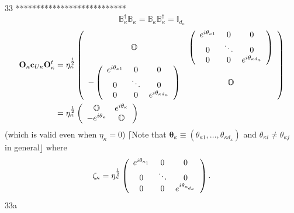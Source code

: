 \documentclass[aps,preprint]{revtex4}%
\begin{document}
33 ***************************
\[
\mathbb{B}_{\kappa}^{\dagger}\mathbb{B}_{\kappa}=\mathbb{B}_{\kappa}%
\mathbb{B}_{\kappa}^{\dagger}=\mathbb{I}_{d_{\kappa}}%
\]%
\begin{align*}
\mathbf{O}_{\kappa}\mathbf{c}_{U\kappa}\mathbf{O}_{\kappa}^{t}  &
=\eta_{\kappa}^{\frac{1}{2}}\left(
\begin{array}
[c]{cc}%
\mathbb{O} & \left(
\begin{array}
[c]{ccc}%
e^{i\mathbf{\theta}_{\kappa1}} & 0 & 0\\
0 & \ddots & 0\\
0 & 0 & e^{i\mathbf{\theta}_{\kappa d_{\kappa}}}%
\end{array}
\right) \\
-\left(
\begin{array}
[c]{ccc}%
e^{i\mathbf{\theta}_{\kappa1}} & 0 & 0\\
0 & \ddots & 0\\
0 & 0 & e^{i\mathbf{\theta}_{\kappa d_{\kappa}}}%
\end{array}
\right)  & \mathbb{O}%
\end{array}
\right) \\
&  =\eta_{\kappa}^{\frac{1}{2}}\left(
\begin{array}
[c]{cc}%
\mathbb{O} & e^{i\mathbf{\theta}_{\kappa}}\\
-e^{i\mathbf{\theta}_{\kappa}} & \mathbb{O}%
\end{array}
\right)
\end{align*}
(which is valid even when $\eta_{\kappa}=0$) $\lceil$Note that $\mathbf{\theta
}_{\kappa}\equiv\left(  \theta_{\kappa1},\ldots,\theta_{\kappa d_{\kappa}%
}\right)  $ and $\theta_{\kappa i}\neq\theta_{\kappa j}$ in general$\rfloor$
where
\[
\mathbf{\zeta}_{\kappa}=\eta_{\kappa}^{\frac{1}{2}}\left(
\begin{array}
[c]{ccc}%
e^{i\mathbf{\theta}_{\kappa_{1}}} & 0 & 0\\
0 & \ddots & 0\\
0 & 0 & e^{i\mathbf{\theta}_{\kappa_{d_{\kappa}}}}%
\end{array}
\right)  .
\]
33a%
\end{document}
